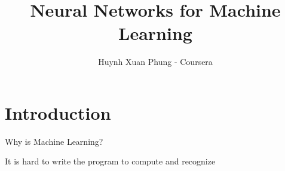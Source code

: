 \documentclass{book}
\title{Neural Networks for Machine Learning}
\author{Huynh Xuan Phung - Coursera}
\date{ }
\begin{document}
 
\maketitle
 
\tableofcontents

\chapter{Introduction}

Why is Machine Learning?

It is hard to write the program to compute and recognize
\end{document}
